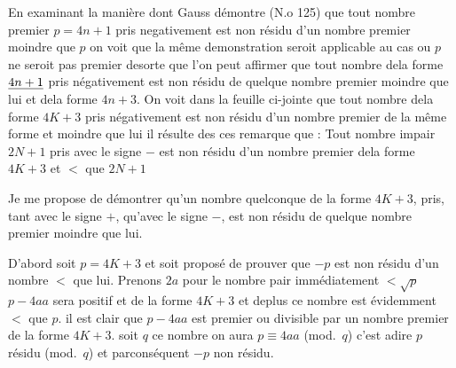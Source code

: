 \documentclass[11pt,a4paper]{article}
\begin{document}


En examinant la manière dont Gauss démontre (N.o 125) que tout nombre premier
$p=4n+1$ pris negativement est non résidu d'un nombre premier moindre que
$p$ on voit que la même demonstration seroit applicable au cas ou $p$ ne seroit
pas premier desorte que l'on peut affirmer que tout nombre dela forme
$\uncertain{4n+1}$ pris négativement est non résidu de quelque nombre premier moindre
que lui et dela forme $4n+3$. On voit dans la feuille ci-jointe que
tout nombre dela forme $4K+3$ pris négativement est non résidu d'un
nombre  premier de la même forme et moindre que lui il résulte
des ces remarque que : Tout nombre impair $2N+1$ pris avec le signe
$-$ est non résidu d'un nombre premier dela forme $4K+3$
et $<$ que $2N+1$


Je me propose de démontrer qu'un nombre quelconque de la forme $4K+3$,
pris, tant avec le signe $+$, qu'avec le signe $-$, est non résidu de quelque
nombre premier moindre que lui.

D'abord soit $p=4K+3$ et soit proposé de prouver que $-p$ est non
résidu d'un nombre $<$ que lui. Prenons $2a$ pour le nombre pair immédiatement
$<\sqrt{p}$ \quad $p-4aa$ sera positif et de la forme $4K+3$ et deplus ce nombre
est évidemment $<$ que $p$. il est clair que $p-4aa$ est premier ou divisible
par un nombre premier de la forme $4K+3$. soit $q$ ce nombre on aura
$p\equiv 4aa$ (mod.~$q$) c'est adire $p$ résidu (mod.~$q$) et parconséquent $-p$ non résidu.
\end{document}
